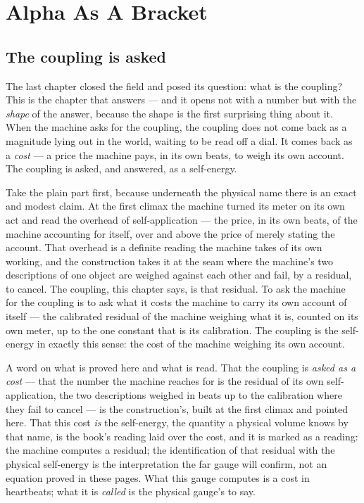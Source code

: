 \chapter{Alpha As A Bracket}

\section{The coupling is asked}

The last chapter closed the field and posed its question: what is the coupling? This is the chapter that answers --- and
it opens not with a number but with the \emph{shape} of the answer, because the shape is the first surprising thing about
it. When the machine asks for the coupling, the coupling does not come back as a magnitude lying out in the world,
waiting to be read off a dial. It comes back as a \emph{cost} --- a price the machine pays, in its own beats, to weigh its
own account. The coupling is asked, and answered, as a self-energy.

Take the plain part first, because underneath the physical name there is an exact and modest claim. At the first climax
the machine turned its meter on its own act and read the overhead of self-application --- the price, in its own beats, of
the machine accounting for itself, over and above the price of merely stating the account. That overhead is a definite
reading the machine takes of its own working, and the construction takes it at the seam where the machine's two
descriptions of one object are weighed against each other and fail, by a residual, to cancel. The coupling, this chapter
says, is that residual. To ask the machine for the coupling is to ask what it costs the machine to carry its own account
of itself --- the calibrated residual of the machine weighing what it is, counted on its own meter, up to the one
constant that is its calibration. The coupling is the self-energy in exactly this sense: the cost of the machine
weighing its own account.

A word on what is proved here and what is read. That the coupling is \emph{asked as a cost} --- that the number the
machine reaches for is the residual of its own self-application, the two descriptions weighed in beats up to the
calibration where they fail to cancel --- is the construction's, built at the first climax and pointed here. That this
cost \emph{is} the self-energy, the quantity a physical volume knows by that name, is the book's reading laid over the
cost, and it is marked as a reading: the machine computes a residual; the identification of that residual with the
physical self-energy is the interpretation the far gauge will confirm, not an equation proved in these pages. What this
gauge computes is a cost in heartbeats; what it is \emph{called} is the physical gauge's to say.


